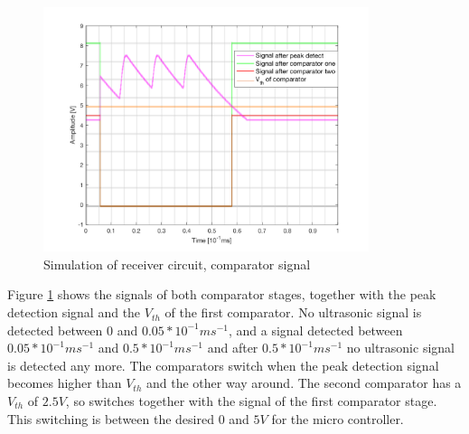 \begin{figure}[H]
\centering
\includegraphics[width=0.85\textwidth]{Figures/receiver_simulations2.PNG}
\caption{Simulation of receiver circuit, comparator signal}
\label{fig:sim_receive2}
\end{figure}



Figure \ref{fig:sim_receive2} shows the signals of both comparator stages, together with the peak detection signal and the $V_{th}$ of the first comparator. No ultrasonic signal is detected between 0 and $0.05*10^{-1}ms^{-1}$, and a signal detected between $0.05*10^{-1}ms^{-1}$ and $0.5*10^{-1}ms^{-1}$ and after $0.5*10^{-1}ms^{-1}$ no ultrasonic signal is detected any more.
The comparators switch when the peak detection signal becomes higher than $V_{th}$ and the other way around. The second comparator has a $V_{th}$ of $2.5V$, so switches together with the signal of the first comparator stage. This switching is between the desired 0 and $5V$ for the micro controller.


